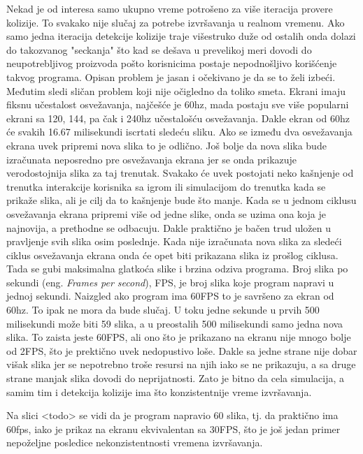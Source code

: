 \documentclass{article}
\begin{document}
{Nekad je od interesa samo ukupno vreme potrošeno za više iteracija provere kolizije.
To svakako nije slučaj za potrebe izvršavanja u realnom vremenu. Ako samo jedna iteracija 
detekcije kolizije traje višestruko duže od ostalih onda dolazi do takozvanog "seckanja" što
kad se dešava  u prevelikoj meri dovodi do neupotrebljivog proizvoda pošto korisnicima postaje nepodnošljivo
korišćenje takvog programa.
Opisan problem je jasan i očekivano je da se to želi izbeći. 
Međutim sledi sličan problem koji nije očigledno da toliko smeta.
Ekrani imaju fiksnu učestalost osvežavanja, najčešće je 60hz, mada postaju sve više popularni 
ekrani sa 120, 144, pa čak i 240hz učestalošću osvežavanja. Dakle ekran od 60hz će svakih 
16.67 milisekundi iscrtati sledeću sliku. Ako se između dva osvežavanja ekrana uvek pripremi
nova slika to je odlično. 
Još bolje da nova slika bude izračunata neposredno pre osvežavanja ekrana jer se onda 
prikazuje verodostojnija slika za taj trenutak. 
Svakako će uvek postojati neko kašnjenje od trenutka interakcije korisnika sa igrom ili simulacijom do
trenutka kada se prikaže slika, ali je cilj da to kašnjenje bude što manje. 
Kada se u jednom ciklusu osvežavanja ekrana pripremi više od jedne slike, onda se uzima ona koja je najnovija,
a prethodne se odbacuju. 
Dakle praktično je bačen trud uložen u pravljenje svih slika osim poslednje.
Kada nije izračunata nova slika za sledeći ciklus osvežavanja ekrana onda će opet biti prikazana slika
iz prošlog ciklusa. Tada se gubi maksimalna glatkoća slike i brzina odziva programa. 
Broj slika po sekundi (eng. {\em Frames per second}), FPS, je broj slika koje program napravi u jednoj sekundi.
Naizgled ako program ima 60FPS to je savršeno za ekran od 60hz. To ipak ne mora da bude slučaj.
U toku jedne sekunde u prvih 500 milisekundi može biti 59 slika, a u preostalih 500 milisekundi samo jedna 
nova slika. To zaista jeste 60FPS, ali ono što je prikazano na ekranu nije mnogo bolje od 2FPS,
što je prektično uvek nedopustivo loše. 
Dakle sa jedne strane nije dobar višak slika jer se nepotrebno troše resursi na njih iako se ne prikazuju, 
a sa druge strane manjak slika dovodi do neprijatnosti.
Zato je bitno da cela simulacija, a samim tim i detekcija kolizije ima što konzistentnije vreme izvršavanja.

Na slici <todo> se vidi da je program napravio 60 slika, tj. da praktično ima 60fps, iako je prikaz na ekranu 
ekvivalentan sa 30FPS, što je još jedan primer nepoželjne posledice nekonzistentnosti vremena izvršavanja. 

}
\end{document}
